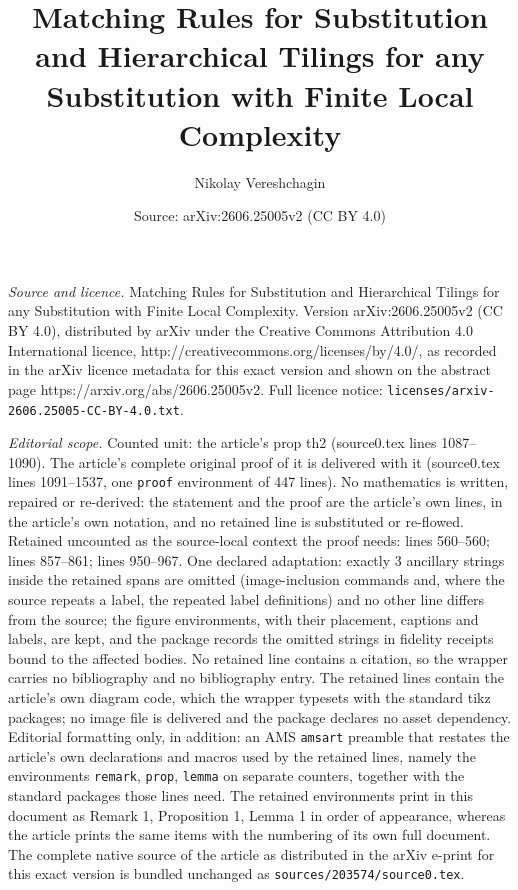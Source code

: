 \documentclass[10pt,a4paper]{amsart}
\title{Matching Rules for Substitution and Hierarchical Tilings for any Substitution with Finite Local Complexity}
\author{Nikolay Vereshchagin}
\date{Source: arXiv:2606.25005v2 (CC BY 4.0)}
\begin{document}
\maketitle

\noindent\emph{Source and licence.} Matching Rules for Substitution and Hierarchical Tilings for any Substitution with Finite Local Complexity. Version arXiv:2606.25005v2 (CC BY 4.0), distributed by arXiv under the Creative Commons Attribution 4.0 International licence, http://creativecommons.org/licenses/by/4.0/, as recorded in the arXiv licence metadata for this exact version and shown on the abstract page https://arxiv.org/abs/2606.25005v2. Full licence notice: \texttt{licenses/arxiv-2606.25005-CC-BY-4.0.txt}.\par\smallskip

\noindent\textit{Editorial scope.} Counted unit: the article's prop th2 (source0.tex lines 1087--1090). The article's complete original proof of it is delivered with it (source0.tex lines 1091--1537, one \texttt{proof} environment of 447 lines). No mathematics is written, repaired or re-derived: the statement and the proof are the article's own lines, in the article's own notation, and no retained line is substituted or re-flowed.  Retained uncounted as the source-local context the proof needs: lines 560--560; lines 857--861; lines 950--967.  One declared adaptation: exactly 3 ancillary strings inside the retained spans are omitted (image-inclusion commands and, where the source repeats a label, the repeated label definitions) and no other line differs from the source; the figure environments, with their placement, captions and labels, are kept, and the package records the omitted strings in fidelity receipts bound to the affected bodies.  No retained line contains a citation, so the wrapper carries no bibliography and no bibliography entry.  The retained lines contain the article's own diagram code, which the wrapper typesets with the standard tikz packages; no image file is delivered and the package declares no asset dependency.  Editorial formatting only, in addition: an AMS \texttt{amsart} preamble that restates the article's own declarations and macros used by the retained lines, namely the environments \texttt{remark}, \texttt{prop}, \texttt{lemma} on separate counters, together with the standard packages those lines need.  The retained environments print in this document as Remark 1, Proposition 1, Lemma 1 in order of appearance, whereas the article prints the same items with the numbering of its own full document.  The complete native source of the article as distributed in the arXiv e-print for this exact version is bundled unchanged as \texttt{sources/203574/source0.tex}.
\end{document}
